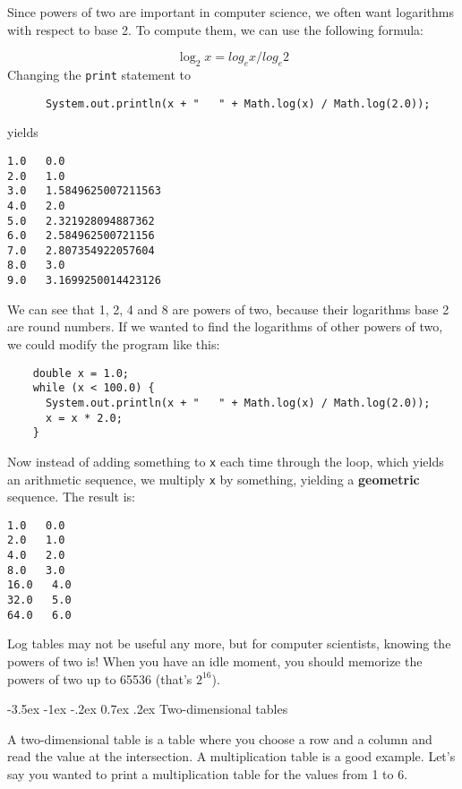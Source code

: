 \documentclass{book}
\makeatletter
\renewcommand{\section}{\@startsection 
    {section} {1} {0mm}%
    {-3.5ex \@plus -1ex \@minus -.2ex}%
    {0.7ex \@plus.2ex}%
    {\normalfont\Large\bfseries}}
\makeatother
\begin{document}
Since powers of two are important
in computer science, we often want logarithms with
respect to base 2.  To compute them, we can use the following
formula:

\begin{equation}
\log_2 x = log_e x / log_e 2
\end{equation}
%
Changing the {\tt print} statement to

\begin{verbatim}
      System.out.println(x + "   " + Math.log(x) / Math.log(2.0));
\end{verbatim}
%
yields

\begin{verbatim}
1.0   0.0
2.0   1.0
3.0   1.5849625007211563
4.0   2.0
5.0   2.321928094887362
6.0   2.584962500721156
7.0   2.807354922057604
8.0   3.0
9.0   3.1699250014423126
\end{verbatim}
%
We can see that 1, 2, 4 and 8 are powers of two, because
their logarithms base 2 are round numbers.  If we wanted to find
the logarithms of other powers of two, we could modify the
program like this:

\begin{verbatim}
    double x = 1.0;
    while (x < 100.0) {
      System.out.println(x + "   " + Math.log(x) / Math.log(2.0));
      x = x * 2.0;
    }
\end{verbatim}
%
Now instead of adding something to {\tt x} each time through
the loop, which yields an arithmetic sequence, we multiply
{\tt x} by something, yielding a {\bf geometric} sequence.
The result is:

\begin{verbatim}
1.0   0.0
2.0   1.0
4.0   2.0
8.0   3.0
16.0   4.0
32.0   5.0
64.0   6.0
\end{verbatim}
%
Log tables may not be useful any more, but for computer scientists,
knowing the powers of two is!  When you have an idle
moment, you should memorize the powers of two up to 65536
(that's $2^{16}$).


\section{Two-dimensional tables}

A two-dimensional table is a table where you choose a row and
a column and read the value at the intersection.  A multiplication
table is a good example.  Let's say you wanted to print a
multiplication table for the values from 1 to 6.
\end{document}

